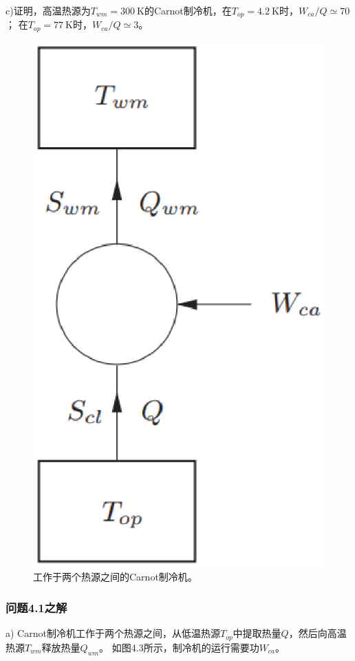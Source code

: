 c)证明，高温热源为$T_{wm}=300\ \mathrm{K}$的Carnot制冷机，在$T_{op}=4.2\ \mathrm{K}$时，$W_{ca}/Q\simeq 70$；
在$T_{op}=77\ \mathrm{K}$时，$W_{ca}/Q\simeq 3$。
\begin{figure}[htbp]
	\centering
	\includegraphics[scale=0.5]{chpt4/figs/fig4.3.eps}
	\caption{工作于两个热源之间的Carnot制冷机。}
\end{figure}

\subsubsection{问题4.1之解}
a) Carnot制冷机工作于两个热源之间，从低温热源$T_{op}$中提取热量$Q$，然后向高温热源$T_{wm}$释放热量$Q_{wm}$。
如图4.3所示，制冷机的运行需要功$W_{ca}$。

